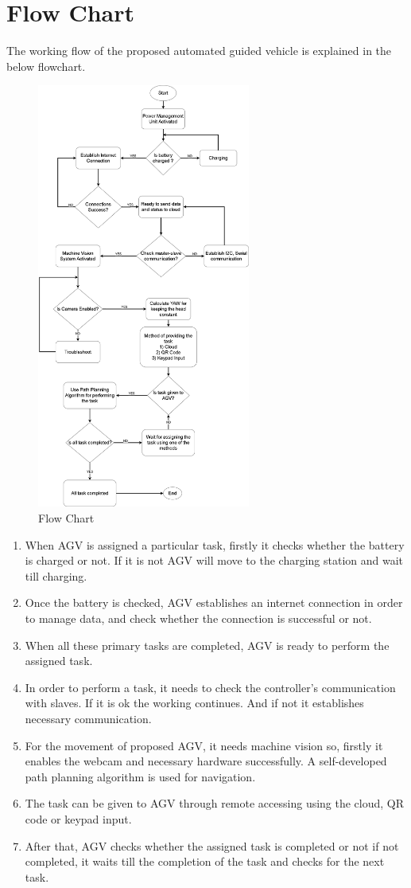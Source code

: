 \documentclass[12pt]{article}
\begin{document}
\section{Flow Chart}

The working flow of the proposed automated guided vehicle is explained in the below flowchart.

\begin{figure}[htp]
\centering
\includegraphics[width=7cm]{Flowchart.png}
\caption{Flow Chart}
\label{fig}
\end{figure}
\newpage
\begin{enumerate}
    \item When AGV is assigned a particular task, firstly it checks whether the battery is charged or not. If it is not AGV will move to the charging station and wait till charging.
    \item Once the battery is checked, AGV establishes an internet connection in order to manage data, and check whether the connection is successful or not.
    \item When all these primary tasks are completed, AGV is ready to perform the assigned task.
    \item In order to perform a task, it needs to check the controller’s communication with slaves. If it is ok the working continues. And if not it establishes necessary communication.
    \item For the movement of proposed AGV, it needs machine vision so, firstly it enables the webcam and necessary hardware successfully. A self-developed path planning algorithm is used for navigation.
    \item The task can be given to AGV through remote accessing using the cloud, QR code or keypad input.
    \item After that, AGV checks whether the assigned task is completed or not if not completed, it waits till the completion of the task and checks for the next task.
\end{enumerate}
\end{document}
